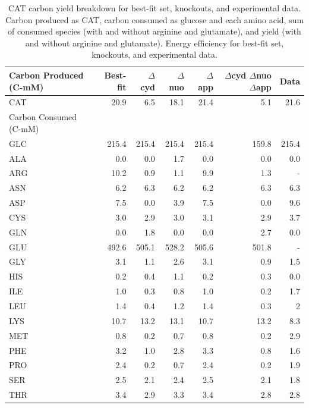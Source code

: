 \documentclass[12pt]{article}
\begin{document}
\begin{table}
\centering
    \caption{CAT carbon yield breakdown for best-fit set, knockouts, and experimental data. Carbon produced as CAT, carbon consumed as glucose and each amino acid, sum of consumed species (with and without arginine and glutamate), and yield  (with and without arginine and glutamate). Energy efficiency for best-fit set, knockouts, and experimental data.}
    \renewcommand{\arraystretch}{1.3}
    \begin{tabular}{lrrrrrr} \toprule
        Carbon Produced (C-mM) & Best-fit & $\Delta$cyd & $\Delta$nuo & $\Delta$app & $\Delta$cyd $\Delta$nuo $\Delta$app & Data \\ \hline
        CAT & 20.9 & 6.5 & 18.1 & 21.4 & 5.1 & 21.6 \\ \midrule
        Carbon Consumed (C-mM) \\ \hline
        GLC & 215.4 & 215.4 & 215.4 & 215.4 & 159.8 & 215.4 \\ \hline
        ALA & 0.0 & 0.0 & 1.7 & 0.0 & 0.0 & 0.0 \\ \hline
        ARG & 10.2 & 0.9 & 1.1 & 9.9 & 1.3 & - \\ \hline
        ASN & 6.2 & 6.3 & 6.2 & 6.2 & 6.3 & 6.3 \\ \hline
        ASP & 7.5 & 0.0 & 3.9 & 7.5 & 0.0 & 9.6 \\ \hline
        CYS & 3.0 & 2.9 & 3.0 & 3.1 & 2.9 & 3.7 \\ \hline
        GLN & 0.0 & 1.8 & 0.0 & 0.0 & 2.7 & 0.0 \\ \hline
        GLU & 492.6 & 505.1 & 528.2 & 505.6 & 501.8 & - \\ \hline
        GLY & 3.1 & 1.1 & 2.6 & 3.1 & 0.9 & 1.5 \\ \hline
        HIS & 0.2 & 0.4 & 1.1 & 0.2 & 0.3 & 0.0 \\ \hline
        ILE & 1.0 & 0.3 & 0.8 & 1.0 & 0.2 & 1.7 \\ \hline
        LEU & 1.4 & 0.4 & 1.2 & 1.4 & 0.3 & 2 \\ \hline
        LYS & 10.7 & 13.2 & 13.1 & 10.7 & 13.2 & 8.3 \\ \hline
        MET & 0.8 & 0.2 & 0.7 & 0.8 & 0.2 & 2.9 \\ \hline
        PHE & 3.2 & 1.0 & 2.8 & 3.3 & 0.8 & 1.6 \\ \hline
        PRO & 2.4 & 0.2 & 0.7 & 2.4 & 0.2 & 1.9 \\ \hline
        SER & 2.5 & 2.1 & 2.4 & 2.5 & 2.1 & 1.8 \\ \hline
        THR & 3.4 & 2.9 & 3.3 & 3.4 & 2.8 & 2.8 \\ \hline

\end{tabular}
\end{table}
\end{document}
